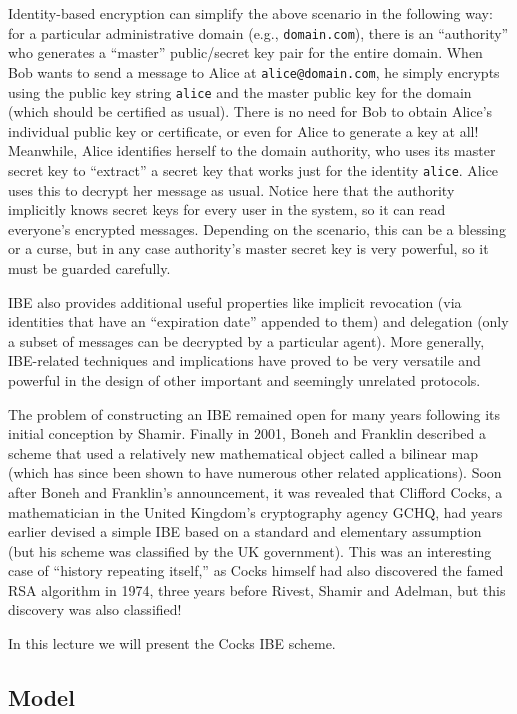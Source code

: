 \documentclass[11pt]{article}
\begin{document}
Identity-based encryption can simplify the above scenario in the
following way: for a particular administrative domain (e.g.,
\texttt{domain.com}), there is an ``authority'' who generates a
``master'' public/secret key pair for the entire domain.  When Bob
wants to send a message to Alice at \texttt{alice@domain.com}, he
simply encrypts using the public key string \texttt{alice} and the
master public key for the domain (which should be certified as usual).
There is no need for Bob to obtain Alice's individual public key or
certificate, or even for Alice to generate a key at all!  Meanwhile,
Alice identifies herself to the domain authority, who uses its master
secret key to ``extract'' a secret key that works just for the
identity \texttt{alice}.  Alice uses this to decrypt her message as
usual.  Notice here that the authority implicitly knows secret keys
for every user in the system, so it can read everyone's encrypted
messages.  Depending on the scenario, this can be a blessing or a
curse, but in any case authority's master secret key is very powerful,
so it must be guarded carefully.

IBE also provides additional useful properties like implicit
revocation (via identities that have an ``expiration date'' appended
to them) and delegation (only a subset of messages can be decrypted by
a particular agent).  More generally, IBE-related techniques and
implications have proved to be very versatile and powerful in the
design of other important and seemingly unrelated protocols.

The problem of constructing an IBE remained open for many years
following its initial conception by Shamir.  Finally in 2001, Boneh
and Franklin described a scheme that used a relatively new
mathematical object called a bilinear map (which has since been shown
to have numerous other related applications).  Soon after Boneh and
Franklin's announcement, it was revealed that Clifford Cocks, a
mathematician in the United Kingdom's cryptography agency GCHQ, had
years earlier devised a simple IBE based on a standard and elementary
assumption (but his scheme was classified by the UK government).  This
was an interesting case of ``history repeating itself,'' as Cocks
himself had also discovered the famed RSA algorithm in 1974, three
years before Rivest, Shamir and Adelman, but this discovery was also
classified!

In this lecture we will present the Cocks IBE scheme.

\subsection{Model}
\label{sec:model}
\end{document}
